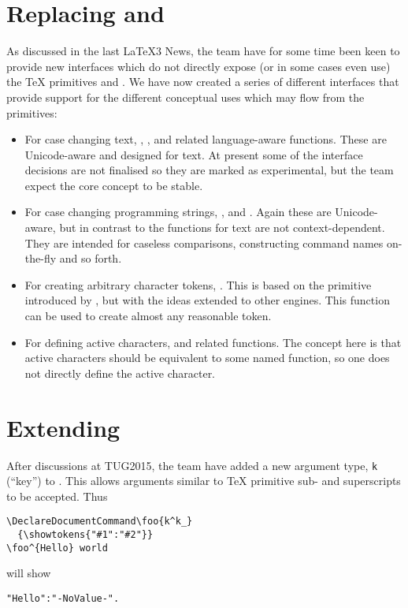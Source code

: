 \documentclass{ltnews}
\begin{document}
\section{Replacing  and }

As discussed in the last \LaTeX3 News, the team have for some time been keen
to provide new interfaces which do not directly expose (or in some cases
even use) the \TeX{} primitives  and . We have
now created a series of different interfaces that provide support for the
different conceptual uses which may flow from the primitives:
\begin{itemize}
  \item For case changing text, , ,
     and related language-aware functions. These are
    Unicode-aware and designed for text. At present some of the interface
    decisions are not finalised so they are marked as experimental, but the team
    expect the core concept to be stable.
  \item For case changing programming strings, ,
     and . Again these are
    Unicode-aware, but in contrast to the functions for text are not
    context-dependent. They are intended for caseless comparisons, constructing
    command names on-the-fly and so forth.
  \item For creating arbitrary character tokens, . This
    is based on the  primitive introduced by , but
    with the ideas extended to other engines. This function can be used to
    create almost any reasonable token.
  \item For defining active characters,  and
    related functions. The concept here is that active characters should be
    equivalent to some named function, so one does not directly define the
    active character.
\end{itemize}

\section{Extending }

After discussions at TUG2015, the team have added a new argument type,
\texttt{k} (\enquote{key}) to . This allows arguments similar
to \TeX{} primitive sub- and superscripts to be accepted. Thus
\begin{verbatim}
\DeclareDocumentCommand\foo{k^k_}
  {\showtokens{"#1":"#2"}}
\foo^{Hello} world
\end{verbatim}
will show
\begin{verbatim}
"Hello":"-NoValue-".
\end{verbatim}
\end{document}
